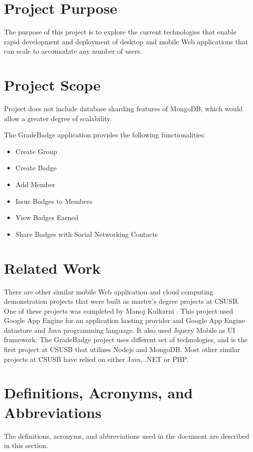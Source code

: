 \section{Project Purpose}
The purpose of this project is to explore the current technologies that enable rapid development and deployment of desktop and mobile Web applications that can scale to accomodate any number of users.

\section{Project Scope}
Project does not include database sharding features of MongoDB, which would allow a greater degree of scalability.

The GradeBadge application provides the following functionalities:
\begin{itemize}
\item Create Group
\item Create Badge 
\item Add Member
\item Issue Badges to Members
\item View Badges Earned
\item Share Badges with Social Networking Contacts
\end{itemize}

\section{Related Work}
There are other similar mobile Web application and cloud computing demonstration projects that were built as master's degree projects at CSUSB.  One of these projects was completed by Manoj Kulkarni \cite{Manoj}.  This project used Google App Engine for an application hosting provider and Google App Engine datastore and Java programming language. It also used Jquery Mobile as UI framework. The GradeBadge project uses different set of technologies, and is the first project at CSUSB that utilizes Nodejs and MongoDB.  Most other similar projects at CSUSB have relied on either Java, .NET or PHP.

\section{Definitions, Acronyms, and Abbreviations}

The definitions, acronyms, and abbreviations used in the document are described in this section.

